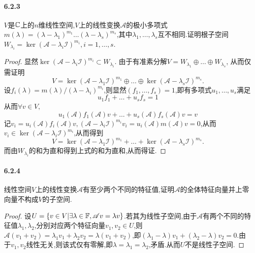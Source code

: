 \documentclass[11pt]{article}
\begin{document}
\paragraph{6.2.3}$V$是$\mathbb{C}$上的$n$维线性空间,$V$上的线性变换$\mathscr{A}$的极小多项式$m(\lambda)=(\lambda-\lambda_1)^{m_1}\dots(\lambda-\lambda_s)^{m_s}$,其中$\lambda_1,\dots,\lambda_s$互不相同.证明根子空间$W_{\lambda_i}=\ker (\mathscr{A}-\lambda_i\mathscr{I})^{m_i}, i=1,\dots,s$.
\begin{proof}
    显然$\ker (\mathscr{A}-\lambda_i\mathscr{I})^{m_i}\subset W_{\lambda_i}$. 由于有准素分解$V=W_{\lambda_1}\oplus\dots\oplus W_{\lambda_s}$, 从而仅需证明
    $$V=\ker (\mathscr{A}-\lambda_1\mathscr{I})^{m_1}\oplus \dots \oplus \ker (\mathscr{A}-\lambda_s\mathscr{I})^{m_s}.$$
    设$f_i(\lambda)=m(\lambda)/(\lambda-\lambda_i)^{m_i}$,则显然$(f_1,\dots,f_s)=1$,即有多项式$u_1,\dots,u_s$满足
    $$u_1f_1+\dots+u_sf_s=1$$
    从而$\forall v\in V,$
    $$u_1(\mathscr{A})f_1(\mathscr{A})v+\dots+u_s(\mathscr{A})f_s(\mathscr{A})v=v$$
    记$v_i=u_i(\mathscr{A})f_i(\mathscr{A})v, (\mathscr{A}-\lambda_i\mathscr{I})^{m_i}v_i=u_i(\mathscr{A})m(\mathscr{A})v=0$,从而$v_i\in \ker (\mathscr{A}-\lambda_i\mathscr{I})^{m_i}$,从而得到
    $$V=\ker (\mathscr{A}-\lambda_1\mathscr{I})^{m_1}+ \dots + \ker (\mathscr{A}-\lambda_s\mathscr{I})^{m_s}.$$
    而由$W_{\lambda_i}$的和为直和得到上式的和为直和,从而得证.
\end{proof}
\paragraph{6.2.4}线性空间$V$上的线性变换$\mathscr{A}$有至少两个不同的特征值,证明$\mathscr{A}$的全体特征向量并上零向量不构成$V$的子空间.
\begin{proof}
    设$U=\left\{v\in V | \exists \lambda\in \mathbb{F}, \mathscr{A}v=\lambda v\right\}$.若其为线性子空间,由于$\mathscr{A}$有两个不同的特征值$\lambda_1,\lambda_2$,分别对应两个特征向量$v_1,v_2\in U$,则$\mathscr{A}(v_1+v_2)=\lambda_1 v_1+ \lambda_2 v_2=\lambda(v_1+v_2)$,即$(\lambda_1-\lambda)v_1+(\lambda_2-\lambda)v_2=0$.由于$v_1, v_2$线性无关,则该式仅有零解,即$\lambda=\lambda_1=\lambda_2$,矛盾.从而$U$不是线性子空间.
\end{proof}
\end{document}
